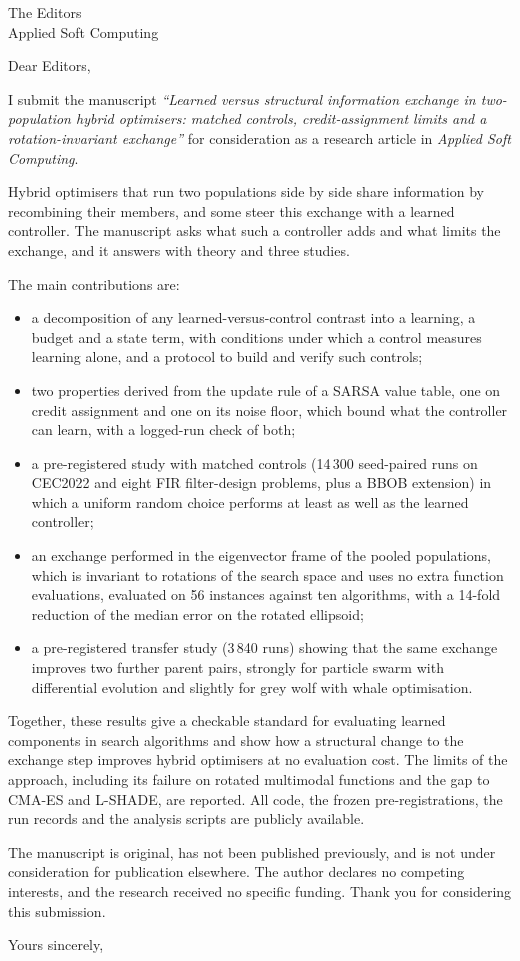 \documentclass[11pt]{letter}
\date{\today}
\begin{document}
\begin{letter}{The Editors\\Applied Soft Computing}

\opening{Dear Editors,}

I submit the manuscript \emph{``Learned versus structural information exchange in two-population hybrid optimisers:
matched controls, credit-assignment limits and a rotation-invariant exchange''} for consideration as a research article in
\emph{Applied Soft Computing}.

Hybrid optimisers that run two populations side by side share information by recombining their members, and some steer
this exchange with a learned controller. The manuscript asks what such a controller adds and what limits the exchange, and
it answers with theory and three studies.

The main contributions are:
\begin{itemize}
\item a decomposition of any learned-versus-control contrast into a learning, a budget and a state term, with conditions
  under which a control measures learning alone, and a protocol to build and verify such controls;
\item two properties derived from the update rule of a SARSA value table, one on credit assignment and one on its noise
  floor, which bound what the controller can learn, with a logged-run check of both;
\item a pre-registered study with matched controls (14\,300 seed-paired runs on CEC2022 and eight FIR filter-design
  problems, plus a BBOB extension) in which a uniform random choice performs at least as well as the learned controller;
\item an exchange performed in the eigenvector frame of the pooled populations, which is invariant to rotations of the
  search space and uses no extra function evaluations, evaluated on 56 instances against ten algorithms, with a
  14-fold reduction of the median error on the rotated ellipsoid;
\item a pre-registered transfer study (3\,840 runs) showing that the same exchange improves two further parent pairs,
  strongly for particle swarm with differential evolution and slightly for grey wolf with whale optimisation.
\end{itemize}

Together, these results give a checkable standard for evaluating learned components in search algorithms and show how a
structural change to the exchange step improves hybrid optimisers at no evaluation cost. The limits of the approach,
including its failure on rotated multimodal functions and the gap to CMA-ES and L-SHADE, are reported. All code, the
frozen pre-registrations, the run records and the analysis scripts are publicly available.

The manuscript is original, has not been published previously, and is not under consideration for publication elsewhere.
The author declares no competing interests, and the research received no specific funding. Thank you for considering this
submission.

\closing{Yours sincerely,}

\end{letter}
\end{document}
